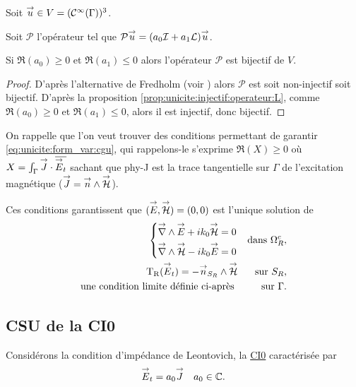   \begin{prop}
    \label{prop:unicite:inversible:operateur:L}
    Soit \({\overset{\rightarrow}{u}} \in V=(\mathcal{C}^\infty(\Gamma))^3\).
    
    Soit \(\mathcal{P}\) l'opérateur tel que \(\mathcal{P}{\overset{\rightarrow}{u}} = (a_0{\mathcal{I}} + a_1 \mathcal{L}){\overset{\rightarrow}{u}}\).

    Si \(\Re(a_0)\ge 0\) et \(\Re(a_1)\le 0\) alors l'opérateur \(\mathcal{P}\) est bijectif de \(V\).
  \end{prop}
  \begin{proof}
    D'après l'alternative de Fredholm (voir \cite[Théorème~VI.6, p.~92]{brezis_analyse_1996})%
      alors \(\mathcal{P}\) est soit non-injectif soit bijectif. D'après la proposition \ref{prop:unicite:injectif:operateur:L}, comme \(\Re(a_0)\ge 0\) et \(\Re(a_1)\le 0\), alors il est injectif, donc bijectif.
  \end{proof}


  On rappelle que l'on veut trouver des conditions permettant de garantir \eqref{eq:unicite:form_var:cgu}, qui rappelons-le s'exprime \(\Re(X)\ge0\) où \(X = \int_\Gamma {\overset{\rightarrow}{J}} \cdot {\overline{{\overset{\rightarrow}{E}}_t}}\) sachant que \gls{phy-J} est la trace tangentielle sur \(\Gamma\) de l’excitation magnétique (\({\overset{\rightarrow}{J}} = {\overset{\rightarrow}{n}} \wedge {\overset{\rightarrow}{\mathcal{H}}}\)).

  Ces conditions garantissent que \(({\overset{\rightarrow}{E}},{\overset{\rightarrow}{\mathcal{H}}}) = (0,0)\) est l'unique solution de 
  \begin{equation}
    \label{eq:unicite:probleme_sans_ci}
    \begin{aligned}
      \left\lbrace
      \begin{aligned}
        {\overset{\rightarrow}{\nabla}}\wedge{{\overset{\rightarrow}{E}}} + ik_0{\overset{\rightarrow}{\mathcal{H}}} &= 0
        \\
        {\overset{\rightarrow}{\nabla}}\wedge{{\overset{\rightarrow}{\mathcal{H}}}} - ik_0{\overset{\rightarrow}{E}} &= 0
      \end{aligned}
      \right. && \text{dans \(\Omega^c_R\)},
      \\
      \operatorname{T_R}({\overset{\rightarrow}{E}}_t) = - {\overset{\rightarrow}{n}}_{S_R} \wedge {\overset{\rightarrow}{\mathcal{H}}} && \text{sur \(S_R\),}
      \\
      \text{une condition limite définie ci-après }  && \text{sur \(\Gamma\).}
    \end{aligned}
  \end{equation}

  \subsection{CSU de la CI0}
    Considérons la condition d’impédance de Leontovich, la \hyperlink{ci0}{CI0} caractérisée par
    \begin{align}
      \label{eq:unicite:ci0}
      {\overset{\rightarrow}{E}}_t = a_0 {\overset{\rightarrow}{J}} &&  a_0 \in \mathbb C.
    \end{align}

